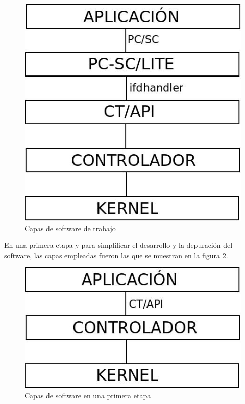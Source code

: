 \begin{figure}[H]
\centering
  \begin{center}
  \includegraphics[scale=.4]{Imagenes/SW_sc1.jpg} 
  \end{center}
  \caption{Capas de software de trabajo}\label{Fig:capas} 
\end{figure}

\bigskip
En una primera etapa y para simplificar el desarrollo y la depuración del software, las capas empleadas fueron las que se muestran en la figura \ref{Fig:capas0}.


\begin{figure}[H]
\centering
  \begin{center}
  \includegraphics[scale=.4]{Imagenes/SW_sc2.jpg} 
  \end{center}
  \caption{Capas de software en una primera etapa}\label{Fig:capas0} 
\end{figure}

